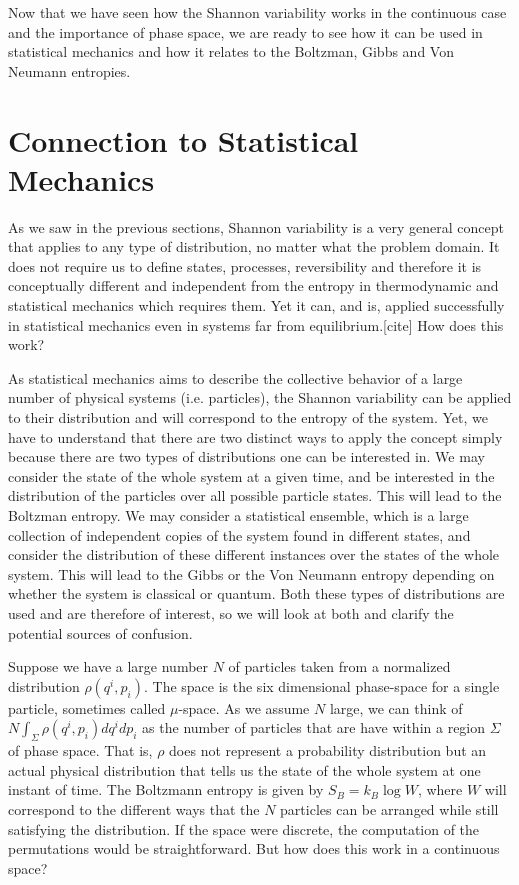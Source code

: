 \documentclass{article}
\begin{document}
Now that we have seen how the Shannon variability works in the continuous case and the importance of phase space, we are ready to see how it can be used in statistical mechanics and how it relates to the Boltzman, Gibbs and Von Neumann entropies.


\section{Connection to Statistical Mechanics\label{csm}}

As we saw in the previous sections, Shannon variability is a very general concept that applies to any type of distribution, no matter what the problem domain. It does not require us to define states, processes, reversibility and therefore it is conceptually different and independent from the entropy in thermodynamic and statistical mechanics which requires them. Yet it can, and is, applied successfully in statistical mechanics even in systems far from equilibrium.[cite] How does this work?

As statistical mechanics aims to describe the collective behavior of a large number of physical systems (i.e. particles), the Shannon variability can be applied to their distribution and will correspond to the entropy of the system. Yet, we have to understand that there are two distinct ways to apply the concept simply because there are two types of distributions one can be interested in. We may consider the state of the whole system at a given time, and be interested in the distribution of the particles over all possible particle states. This will lead to the Boltzman entropy. We may consider a statistical ensemble, which is a large collection of independent copies of the system found in different states, and consider the distribution of these different instances over the states of the whole system. This will lead to the Gibbs or the Von Neumann entropy depending on whether the system is classical or quantum. Both these types of distributions are used and are therefore of interest, so we will look at both and clarify the potential sources of confusion.

Suppose we have a large number $N$ of particles taken from a normalized distribution $\rho(q^i, p_i)$. The space is the six dimensional phase-space for a single particle, sometimes called $\mu$-space. As we assume $N$ large, we can think of $N\int_\Sigma \rho(q^i, p_i)dq^idp_i$ as the number of particles that are have within a region $\Sigma$ of phase space. That is, $\rho$ does not represent a probability distribution but an actual physical distribution that tells us the state of the whole system at one instant of time. The Boltzmann entropy is given by $S_B = k_B \log W$, where $W$ will correspond to the different ways that the $N$ particles can be arranged while still satisfying the distribution. If the space were discrete, the computation of the permutations would be straightforward. But how does this work in a continuous space?
\end{document}
